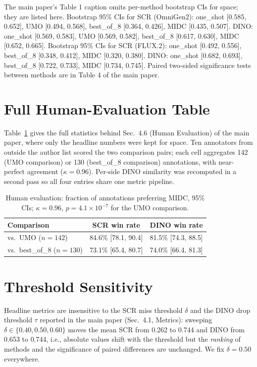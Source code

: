 \documentclass[letterpaper]{article}
\begin{document}
The main paper's Table 1 caption omits per-method bootstrap CIs for space; they are listed here. Bootstrap 95\% CIs for SCR (OmniGen2): one\_shot [0.585, 0.652], UMO [0.494, 0.568], best\_of\_8 [0.364, 0.426], MIDC [0.435, 0.507]. DINO: one\_shot [0.569, 0.583], UMO [0.569, 0.582], best\_of\_8 [0.617, 0.630], MIDC [0.652, 0.665]. Bootstrap 95\% CIs for SCR (FLUX.2): one\_shot [0.492, 0.556], best\_of\_8 [0.348, 0.412], MIDC [0.320, 0.380]. DINO: one\_shot [0.682, 0.693], best\_of\_8 [0.722, 0.733], MIDC [0.734, 0.745]. Paired two-sided significance tests between methods are in Table 4 of the main paper.

\section{Full Human-Evaluation Table}
\label{sec:human}

Table~\ref{tab:human} gives the full statistics behind Sec.~4.6 (Human Evaluation) of the main paper, where only the headline numbers were kept for space. Ten annotators from outside the author list scored the two comparison pairs; each cell aggregates 142 (UMO comparison) or 130 (best\_of\_8 comparison) annotations, with near-perfect agreement ($\kappa{=}0.96$). Per-side DINO similarity was recomputed in a second pass so all four entries share one metric pipeline.

\begin{table}[t]
\centering
\small
\setlength{\tabcolsep}{1.5pt}
\begin{tabular}{lcc}
\toprule
Comparison & SCR win rate & DINO win rate \\
\midrule
vs.\ UMO ($n{=}142$) & 84.6\% [78.1, 90.4] & 81.5\% [74.3, 88.5] \\
vs.\ best\_of\_8 ($n{=}130$) & 73.1\% [65.4, 80.7] & 74.0\% [66.4, 81.3] \\
\bottomrule
\end{tabular}
\caption{Human evaluation: fraction of annotations preferring MIDC, 95\% CIs; $\kappa{=}0.96$, $p{=}4.1{\times}10^{-7}$ for the UMO comparison.}
\label{tab:human}
\end{table}

\section{Threshold Sensitivity}
\label{sec:sweep}

Headline metrics are insensitive to the SCR miss threshold $\delta$ and the DINO drop threshold $\tau$ reported in the main paper (Sec.~4.1, Metrics): sweeping $\delta \in \{0.40, 0.50, 0.60\}$ moves the mean SCR from 0.262 to 0.744 and DINO from 0.653 to 0.744, i.e., absolute values shift with the threshold but the \emph{ranking} of methods and the significance of paired differences are unchanged. We fix $\delta{=}0.50$ everywhere.
\end{document}
